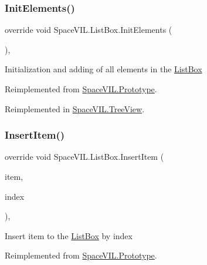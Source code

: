 \subsubsection{\texorpdfstring{Init\+Elements()}{InitElements()}}
{\footnotesize\ttfamily override void Space\+V\+I\+L.\+List\+Box.\+Init\+Elements (\begin{DoxyParamCaption}{ }\end{DoxyParamCaption})\hspace{0.3cm}{\ttfamily [inline]}, {\ttfamily [virtual]}}



Initialization and adding of all elements in the \mbox{\hyperlink{class_space_v_i_l_1_1_list_box}{List\+Box}} 



Reimplemented from \mbox{\hyperlink{class_space_v_i_l_1_1_prototype_ac3379fe02923ee155b5b0084abf27420}{Space\+V\+I\+L.\+Prototype}}.



Reimplemented in \mbox{\hyperlink{class_space_v_i_l_1_1_tree_view_ac44a1df7d58a35e35842170162645e08}{Space\+V\+I\+L.\+Tree\+View}}.

\mbox{\label{class_space_v_i_l_1_1_list_box_a3d5da8acbfd4f0bb11594b5f4b9001c0}} 
\subsubsection{\texorpdfstring{Insert\+Item()}{InsertItem()}}
{\footnotesize\ttfamily override void Space\+V\+I\+L.\+List\+Box.\+Insert\+Item (\begin{DoxyParamCaption}\item[{\mbox{\hyperlink{interface_space_v_i_l_1_1_core_1_1_i_base_item}{I\+Base\+Item}}}]{item,  }\item[{Int32}]{index }\end{DoxyParamCaption})\hspace{0.3cm}{\ttfamily [inline]}, {\ttfamily [virtual]}}



Insert item to the \mbox{\hyperlink{class_space_v_i_l_1_1_list_box}{List\+Box}} by index 



Reimplemented from \mbox{\hyperlink{class_space_v_i_l_1_1_prototype_a9dd004dfa4ca2ea37c21770a24434270}{Space\+V\+I\+L.\+Prototype}}.

